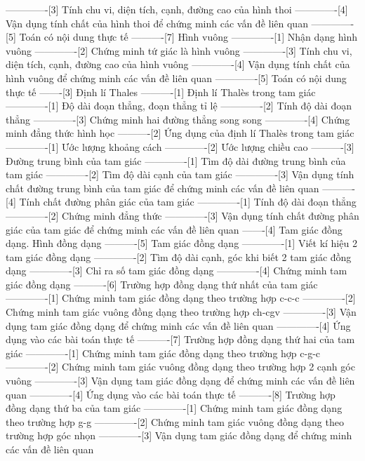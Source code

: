 -------------[3] Tính chu vi, diện tích, cạnh, đường cao của hình thoi
-------------[4] Vận dụng tính chất của hình thoi để chứng minh các vấn đề liên quan
-------------[5] Toán có nội dung thực tế
----------[7] Hình vuông
-------------[1] Nhận dạng hình vuông
-------------[2] Chứng minh tứ giác là hình vuông
-------------[3] Tính chu vi, diện tích, cạnh, đường cao của hình vuông
-------------[4] Vận dụng tính chất của hình vuông để chứng minh các vấn đề liên quan
-------------[5] Toán có nội dung thực tế
-------[3] Định lí Thales
----------[1] Định lí Thalès trong tam giác
-------------[1] Độ dài đoạn thẳng, đoạn thẳng tỉ lệ
-------------[2] Tính độ dài đoạn thẳng
-------------[3] Chứng minh hai đường thẳng song song
-------------[4] Chứng minh đẳng thức hình học
----------[2] Ứng dụng của định lí Thalès trong tam giác
-------------[1] Ước lượng khoảng cách
-------------[2] Ước lượng chiều cao
----------[3] Đường trung bình của tam giác
-------------[1] Tìm độ dài đường trung bình của tam giác
-------------[2] Tìm độ dài cạnh của tam giác
-------------[3] Vận dụng tính chất đường trung bình của tam giác để chứng minh các vấn đề liên quan
----------[4] Tính chất đường phân giác của tam giác
-------------[1] Tính độ dài đoạn thẳng
-------------[2] Chứng minh đẳng thức
-------------[3] Vận dụng tính chất đường phân giác của tam giác để chứng minh các vấn đề liên quan
-------[4] Tam giác đồng dạng. Hình đồng dạng
----------[5] Tam giác đồng dạng
-------------[1] Viết kí hiệu 2 tam giác đồng dạng
-------------[2] Tìm độ dài cạnh, góc khi biết 2 tam giác đồng dạng
-------------[3] Chỉ ra số tam giác đồng dạng
-------------[4] Chứng minh tam giác đồng dạng
----------[6] Trường hợp đồng dạng thứ nhất của tam giác
-------------[1] Chứng minh tam giác đồng dạng theo trường hợp c-c-c
-------------[2] Chứng minh tam giác vuông đồng dạng theo trường hợp ch-cgv
-------------[3] Vận dụng tam giác đồng dạng để chứng minh các vấn đề liên quan
-------------[4] Ứng dụng vào các bài toán thực tế
----------[7] Trường hợp đồng dạng thứ hai của tam giác
-------------[1] Chứng minh tam giác đồng dạng theo trường hợp c-g-c
-------------[2] Chứng minh tam giác vuông đồng dạng theo trường hợp 2 cạnh góc vuông
-------------[3] Vận dụng tam giác đồng dạng để chứng minh các vấn đề liên quan
-------------[4] Ứng dụng vào các bài toán thực tế
----------[8] Trường hợp đồng dạng thứ ba của tam giác
-------------[1] Chứng minh tam giác đồng dạng theo trường hợp g-g
-------------[2] Chứng minh tam giác vuông đồng dạng theo trường hợp góc nhọn
-------------[3] Vận dụng tam giác đồng dạng để chứng minh các vấn đề liên quan
